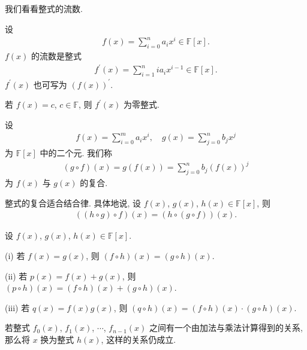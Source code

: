 我们看看整式的流数.

\begin{definition}
    设
    \begin{align*}
        f(x) = \sum_{i = 0}^{n} a_i x^i \in \mathbb{F}[x].
    \end{align*}
    $f(x)$ 的流数是整式
    \begin{align*}
        f^{\prime}(x) = \sum_{i = 1}^{n} i a_i x^{i - 1} \in \mathbb{F}[x].
    \end{align*}
    $f^{\prime} (x)$ 也可写为 $(f(x))^{\prime}$.
\end{definition}

\begin{remark}
    若 $f(x) = c$, $c \in \mathbb{F}$, 则 $f^{\prime} (x)$ 为零整式.
\end{remark}

\begin{definition}
    设
    \begin{align*}
        f(x) = \sum_{i = 0}^{m} a_i x^i, \quad g(x) = \sum_{j = 0}^{n} b_j x^j
    \end{align*}
    为 $\mathbb{F}[x]$ 中的二个元. 我们称
    \begin{align*}
        (g \circ f)(x) = g(f(x)) = \sum_{j = 0}^{n} b_j (f(x))^j
    \end{align*}
    为 $f(x)$ 与 $g(x)$ 的复合.
\end{definition}

\begin{proposition}
    整式的复合适合结合律. 具体地说, 设 $f(x)$, $g(x)$, $h(x) \in \mathbb{F}[x]$, 则
    \begin{align*}
        ((h \circ g) \circ f)(x) = (h \circ (g \circ f))(x).
    \end{align*}
\end{proposition}

\begin{proposition}
    设 $f(x)$, $g(x)$, $h(x) \in \mathbb{F}[x]$.

    (i) 若 $f(x) = g(x)$, 则 $(f \circ h)(x) = (g \circ h)(x)$.

    (ii) 若 $p(x) = f(x) + g(x)$, 则 $(p \circ h)(x) = (f \circ h)(x) + (g \circ h)(x)$.

    (iii) 若 $q(x) = f(x) g(x)$, 则 $(q \circ h)(x) = (f \circ h)(x) \cdot (g \circ h)(x)$.
\end{proposition}

\begin{proposition}
    若整式 $f_0 (x)$, $f_1 (x)$, $\cdots$, $f_{n-1} (x)$ 之间有一个由加法与乘法计算得到的关系, 那么将 $x$ 换为整式 $h(x)$, 这样的关系仍成立.
\end{proposition}

